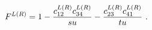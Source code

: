 \begin{equation}
F^{L(R)}=1-{c_{12}^{L(R)}c_{34}^{L(R)}\over su}
-{c_{23}^{L(R)}c_{41}^{L(R)}\over tu} \ .
\end{equation}

